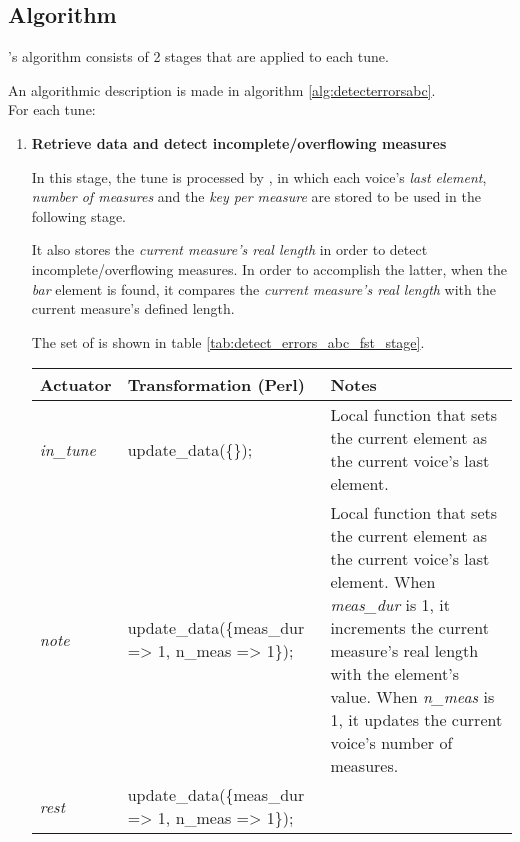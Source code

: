 \subsection*{Algorithm}

\detecterrorsabc{}'s algorithm consists of 2 stages that are applied to each tune.

An algorithmic description is made in algorithm \ref{alg:detecterrorsabc}.\\

For each tune:

\begin{enumerate}
  \item \textbf{Retrieve data and detect incomplete/overflowing measures}

  In this stage, the tune is processed by \dt{}, in which each voice's \emph{last \abc {} element},
  \emph{number of measures} and the \emph{key per measure} are stored to be used in the following
  stage.

  It also stores the \emph{current measure's real length} in order to detect incomplete/overflowing
  measures. In order to accomplish the latter, when the \emph{bar} element is found, it compares the
  \emph{current measure's real length} with the current measure's defined length.

  The set of \abcdtrules{} is shown in table \ref{tab:detect_errors_abc_fst_stage}.

  \begin{center}
    \begin{table}[h]
      \begin{tabular}{|p{2cm}|p{6cm}|p{7.5cm}|}
        \hline
        Actuator & Transformation (Perl) & Notes\\
        \hline
        \hline
        \emph{in\_tune} & update\_data(\{\}); & Local function that sets the current element as the
        current voice's last \abc{} element.
        \\
        \hline

        \hline
        \emph{note} & update\_data(\{meas\_dur => 1, n\_meas => 1\}); & Local function that sets the
        current element as the current voice's last \abc{} element. When \emph{meas\_dur} is 1, it
        increments the current measure's real length with the element's value. When \emph{n\_meas}
        is 1, it updates the current voice's number of measures.
        \\
        \hline

        \hline
        \emph{rest} & update\_data(\{meas\_dur => 1, n\_meas => 1\}); &
        \\
        \hline


\end{tabular}
\end{table}
\end{center}
\end{enumerate}
